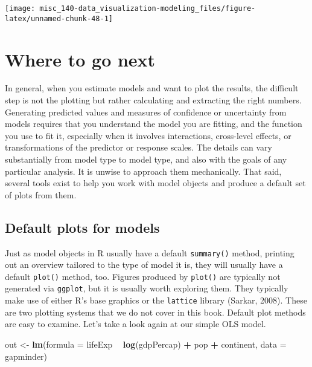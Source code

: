 \documentclass[]{book}
\newenvironment{Shaded}{\begin{snugshade}}{\end{snugshade}}
\newcommand{\DataTypeTok}[1]{\textcolor[rgb]{0.13,0.29,0.53}{#1}}
\newcommand{\KeywordTok}[1]{\textcolor[rgb]{0.13,0.29,0.53}{\textbf{#1}}}
\newcommand{\NormalTok}[1]{#1}
\newcommand{\OperatorTok}[1]{\textcolor[rgb]{0.81,0.36,0.00}{\textbf{#1}}}
\newcommand{\StringTok}[1]{\textcolor[rgb]{0.31,0.60,0.02}{#1}}
\begin{document}
\begin{center}\texttt{[image: misc\_140-data\_visualization-modeling\_files/figure-latex/unnamed-chunk-48-1]} \end{center}

\hypertarget{where-to-go-next}{%
\section{Where to go next}\label{where-to-go-next}}

In general, when you estimate models and want to plot the results, the difficult step is not the plotting but rather calculating and extracting the right numbers. Generating predicted values and measures of confidence or uncertainty from models requires that you understand the model you are fitting, and the function you use to fit it, especially when it involves interactions, cross-level effects, or transformations of the predictor or response scales. The details can vary substantially from model type to model type, and also with the goals of any particular analysis. It is unwise to approach them mechanically. That said, several tools exist to help you work with model objects and produce a default set of plots from them.

\hypertarget{default-plots-for-models}{%
\subsection{Default plots for models}\label{default-plots-for-models}}

Just as model objects in R usually have a default \texttt{summary()} method, printing out an overview tailored to the type of model it is, they will usually have a default \texttt{plot()} method, too. Figures produced by \texttt{plot()} are typically not generated via \texttt{ggplot}, but it is usually worth exploring them. They typically make use of either R's base graphics or the \texttt{lattice} library (Sarkar, 2008). These are two plotting systems that we do not cover in this book. Default plot methods are easy to examine. Let's take a look again at our simple OLS model.\\

\begin{Shaded}
\begin{Highlighting}[]
\NormalTok{out <-}\StringTok{ }\KeywordTok{lm}\NormalTok{(}\DataTypeTok{formula =}\NormalTok{ lifeExp }\OperatorTok{~}\StringTok{ }\KeywordTok{log}\NormalTok{(gdpPercap) }\OperatorTok{+}\StringTok{ }\NormalTok{pop }\OperatorTok{+}\StringTok{ }\NormalTok{continent, }\DataTypeTok{data =}\NormalTok{ gapminder)}
\end{Highlighting}
\end{Shaded}
\end{document}
